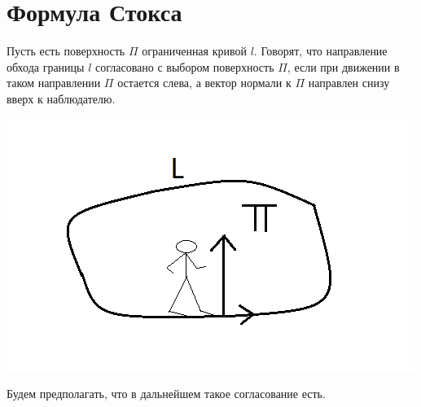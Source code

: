 \documentclass[../../main.tex]{subfiles}
\begin{document}
	\section{Формула Стокса}
	
	Пусть есть поверхность $\Pi$ ограниченная кривой $l$. Говорят, что направление обхода границы $l$ согласовано с выбором поверхность $\Pi$, если при движении в таком направлении $\Pi$ остается слева, а вектор нормали к $\Pi$ направлен снизу вверх к наблюдателю.
	
	\begin{center}
		\includegraphics[scale = 0.8]{lec_25_Human_direction}
	\end{center}
	
	Будем предполагать, что в дальнейшем такое согласование есть.
	
\end{document}
